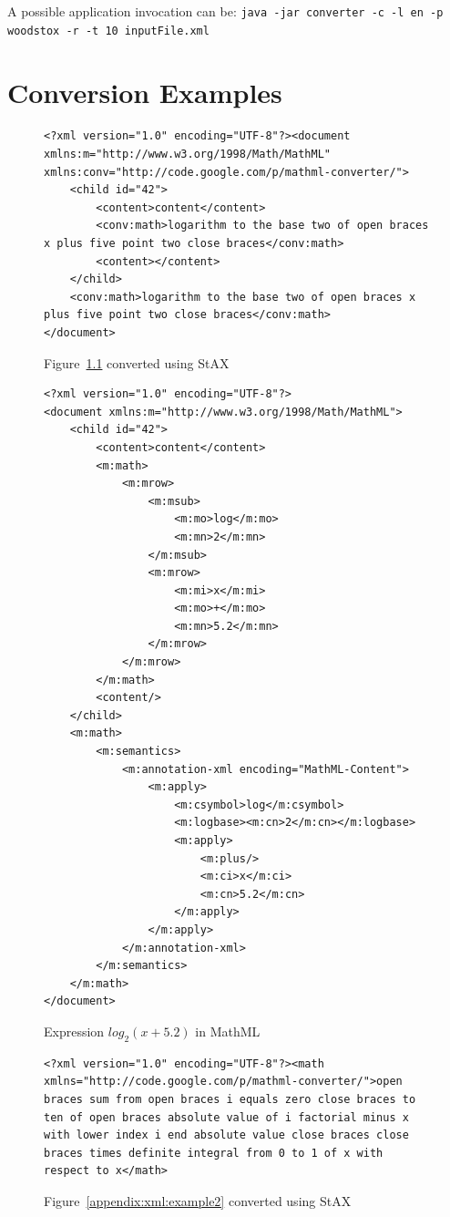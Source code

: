 \documentclass[11pt,oneside,final]{fithesis2}
\begin{document}
A possible application invocation can be: \texttt{java -jar converter -c -l en -p woodstox -r -t 10 inputFile.xml}

\chapter{Conversion Examples}
\label{appendix:conversionexamples}

\begin{figure}[!ht]
\lstset{language=XML,frame=lines}
\begin{lstlisting}
<?xml version="1.0" encoding="UTF-8"?><document xmlns:m="http://www.w3.org/1998/Math/MathML" xmlns:conv="http://code.google.com/p/mathml-converter/">
	<child id="42">
		<content>content</content>		
		<conv:math>logarithm to the base two of open braces x plus five point two close braces</conv:math>
		<content></content>
	</child>
	<conv:math>logarithm to the base two of open braces x plus five point two close braces</conv:math>
</document>
\end{lstlisting}
\caption{Figure~\ref{appendix:xml:example1} converted using StAX}
\end{figure}

\begin{figure}[!ht]
\lstset{language=XML,frame=lines}
\begin{lstlisting}
<?xml version="1.0" encoding="UTF-8"?>
<document xmlns:m="http://www.w3.org/1998/Math/MathML">
	<child id="42">
		<content>content</content>		
		<m:math>
			<m:mrow>
				<m:msub>
					<m:mo>log</m:mo>
					<m:mn>2</m:mn>
				</m:msub>
				<m:mrow>
					<m:mi>x</m:mi>
					<m:mo>+</m:mo>
					<m:mn>5.2</m:mn>
				</m:mrow>
			</m:mrow>			
		</m:math>
		<content/>
	</child>
	<m:math>
		<m:semantics>
			<m:annotation-xml encoding="MathML-Content">
				<m:apply>
					<m:csymbol>log</m:csymbol>
					<m:logbase><m:cn>2</m:cn></m:logbase>
					<m:apply>
						<m:plus/>
						<m:ci>x</m:ci>
						<m:cn>5.2</m:cn>
					</m:apply>
				</m:apply>
			</m:annotation-xml>
		</m:semantics>
	</m:math>
</document>
\end{lstlisting}
\caption{Expression $log_2 (x+5.2)$ in MathML}
\label{appendix:xml:example1}
\end{figure}

\begin{figure}[!ht]
\lstset{language=XML,frame=lines}
\begin{lstlisting}
<?xml version="1.0" encoding="UTF-8"?><math xmlns="http://code.google.com/p/mathml-converter/">open braces sum from open braces i equals zero close braces to ten of open braces absolute value of i factorial minus x with lower index i end absolute value close braces close braces times definite integral from 0 to 1 of x with respect to x</math>
\end{lstlisting}
\caption{Figure~\ref{appendix:xml:example2} converted using StAX}
\end{figure}
\end{document}
